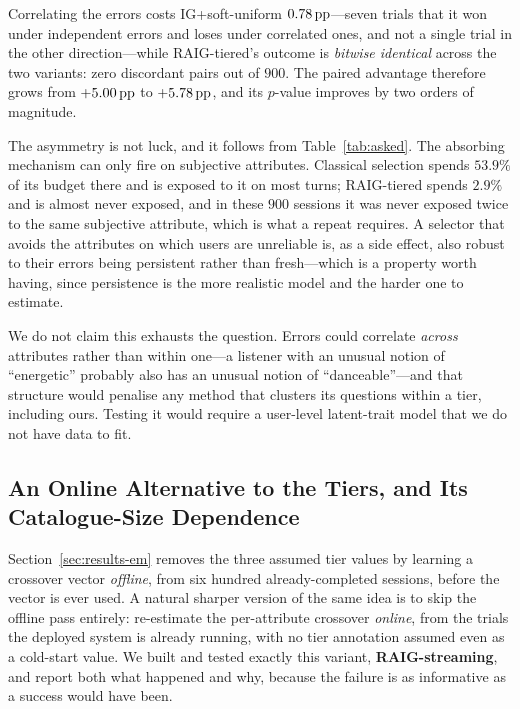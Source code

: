 Correlating the errors costs IG+soft-uniform $0.78\,\text{pp}$---seven trials that it
won under independent errors and loses under correlated ones, and not a single
trial in the other direction---while RAIG-tiered's outcome is
\emph{bitwise identical} across the two variants: zero discordant pairs out of
$900$. The paired advantage therefore grows from $+5.00\,\text{pp}$ to $+5.78\,\text{pp}$, and
its $p$-value improves by two orders of magnitude.

The asymmetry is not luck, and it follows from Table~\ref{tab:asked}. The
absorbing mechanism can only fire on subjective attributes. Classical selection
spends $53.9\%$ of its budget there and is exposed to it on most turns;
RAIG-tiered spends $2.9\%$ and is almost never exposed, and in these $900$
sessions it was never exposed twice to the same subjective attribute, which is
what a repeat requires. A selector that avoids the attributes on which users
are unreliable is, as a side effect, also robust to their errors being
persistent rather than fresh---which is a property worth having, since
persistence is the more realistic model and the harder one to estimate.

We do not claim this exhausts the question. Errors could correlate
\emph{across} attributes rather than within one---a listener with an unusual
notion of ``energetic'' probably also has an unusual notion of
``danceable''---and that structure would penalise any method that clusters its
questions within a tier, including ours. Testing it would require a
user-level latent-trait model that we do not have data to fit.

\subsection{An Online Alternative to the Tiers, and Its Catalogue-Size Dependence}
\label{sec:results-streaming}

Section~\ref{sec:results-em} removes the three assumed tier values by learning
a crossover vector \emph{offline}, from six hundred already-completed
sessions, before the vector is ever used. A natural sharper version of the
same idea is to skip the offline pass entirely: re-estimate the per-attribute
crossover \emph{online}, from the trials the deployed system is already
running, with no tier annotation assumed even as a cold-start value. We built
and tested exactly this variant, \textbf{RAIG-streaming}, and report both what
happened and why, because the failure is as informative as a success would
have been.

